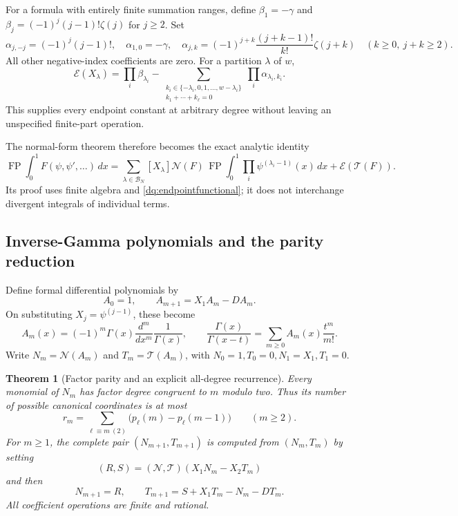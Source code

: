 \documentclass[11pt,a4paper]{article}
\numberwithin{equation}{section}
\theoremstyle{plain}
\newtheorem{theorem}{Theorem}[section]
\theoremstyle{definition}
\theoremstyle{remark}
\begin{document}
For a formula with entirely finite summation ranges, define
$\beta_1=-\gamma$ and $\beta_j=(-1)^j(j-1)!\zeta(j)$ for $j\ge2$.
Set
\[
 \alpha_{j,-j}=(-1)^j(j-1)!,\quad \alpha_{1,0}=-\gamma,
 \quad
 \alpha_{j,k}=(-1)^{j+k}\frac{(j+k-1)!}{k!}\zeta(j+k)
 \quad(k\ge0,\ j+k\ge2).
\]
All other negative-index coefficients are zero. For a partition
$\lambda$ of $w$,
\begin{equation}\label{dq:finiteendpoint}
 \mathcal E(X_\lambda)=\prod_i\beta_{\lambda_i}
 -\sum_{\substack{
 k_i\in\{-\lambda_i,0,1,\ldots,w-\lambda_i\}\\
 k_1+\cdots+k_\ell=0}}
       \prod_i\alpha_{\lambda_i,k_i}.
\end{equation}
This supplies every endpoint constant at arbitrary degree without
leaving an unspecified finite-part operation.

The normal-form theorem therefore becomes the exact analytic identity
\begin{equation}\label{dq:integratednormalform}
 \operatorname{FP}\int_0^1F(\psi,\psi',\ldots)\,dx
 =\sum_{\lambda\in\mathscr B_N}
   [X_\lambda]\mathcal N(F)\,
   \operatorname{FP}\int_0^1\prod_i\psi^{(\lambda_i-1)}(x)\,dx
   +\mathcal E(\mathcal T(F)).
\end{equation}
Its proof uses finite algebra and \eqref{dq:endpointfunctional}; it
does not interchange divergent integrals of individual terms.

\subsection{Inverse-Gamma polynomials and the parity reduction}

Define formal differential polynomials by
\begin{equation}\label{dq:Arecurrence}
 A_0=1,\qquad A_{m+1}=X_1A_m-DA_m.
\end{equation}
On substituting $X_j=\psi^{(j-1)}$, these become
\[
 A_m(x)=(-1)^m\Gamma(x)\frac{d^m}{dx^m}\frac1{\Gamma(x)},
 \qquad
 \frac{\Gamma(x)}{\Gamma(x-t)}=
                 \sum_{m\ge0}A_m(x)\frac{t^m}{m!}.
\]
Write $N_m=\mathcal N(A_m)$ and $T_m=\mathcal T(A_m)$, with
$N_0=1,T_0=0,N_1=X_1,T_1=0$.

\begin{theorem}[Factor parity and an explicit all-degree recurrence]
\label{dq:parity}
Every monomial of $N_m$ has factor degree congruent to $m$ modulo two.
Thus its number of possible canonical coordinates is at most
\begin{equation}\label{dq:paritycount}
 r_m=\sum_{\ell\equiv m\ (2)}
             \bigl(p_\ell(m)-p_\ell(m-1)\bigr)\qquad(m\ge2).
\end{equation}
For $m\ge1$, the complete pair $(N_{m+1},T_{m+1})$ is computed
from $(N_m,T_m)$ by setting
\[
 (R,S)=(\mathcal N,\mathcal T)(X_1N_m-X_2T_m)
\]
and then
\begin{equation}\label{dq:pairrecurrence}
 N_{m+1}=R,\qquad
 T_{m+1}=S+X_1T_m-N_m-DT_m.
\end{equation}
All coefficient operations are finite and rational.
\end{theorem}
\end{document}
